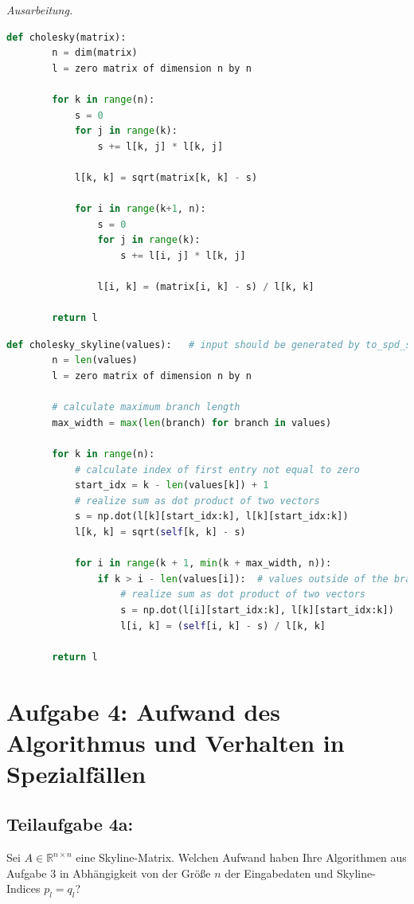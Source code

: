 \documentclass[]{article}
\newenvironment{ausarbeitung}{\vspace{3mm}\noindent\textit{Ausarbeitung.}}{}
\begin{document}
\begin{ausarbeitung}
	\begin{lstlisting}[language=Python, caption=Algorithmus für die Cholesky Zerlegung einer Matrix aus der Vorlesung]
	def cholesky(matrix):	
		n = dim(matrix)
		l = zero matrix of dimension n by n

		for k in range(n):
			s = 0
			for j in range(k):
				s += l[k, j] * l[k, j]

			l[k, k] = sqrt(matrix[k, k] - s)

			for i in range(k+1, n):
				s = 0
				for j in range(k):
					s += l[i, j] * l[k, j]

				l[i, k] = (matrix[i, k] - s) / l[k, k]

		return l
	\end{lstlisting}
	
	\begin{lstlisting}[language=Python, caption=Optimierter Algorithmus für die Cholesky Zerlegung einer Skyline-Matrix]
	def cholesky_skyline(values):	# input should be generated by to_spd_skyline
		n = len(values)
		l = zero matrix of dimension n by n

		# calculate maximum branch length
		max_width = max(len(branch) for branch in values)

		for k in range(n):
			# calculate index of first entry not equal to zero
			start_idx = k - len(values[k]) + 1
			# realize sum as dot product of two vectors
			s = np.dot(l[k][start_idx:k], l[k][start_idx:k])
			l[k, k] = sqrt(self[k, k] - s)

			for i in range(k + 1, min(k + max_width, n)):
				if k > i - len(values[i]):	# values outside of the branch are zero
					# realize sum as dot product of two vectors
					s = np.dot(l[i][start_idx:k], l[k][start_idx:k])
					l[i, k] = (self[i, k] - s) / l[k, k]

		return l
	\end{lstlisting}
\end{ausarbeitung}
\newpage



\section*{Aufgabe 4: Aufwand des Algorithmus und Verhalten in Spezialfällen}


\subsection*{Teilaufgabe 4a:}
Sei $A \in \mathbb{R}^{n\times n}$ eine Skyline-Matrix. Welchen Aufwand haben Ihre Algorithmen aus Aufgabe 3 in Abhängigkeit von der Größe $n$ der Eingabedaten und Skyline-Indices $p_l = q_l$?
\end{document}
